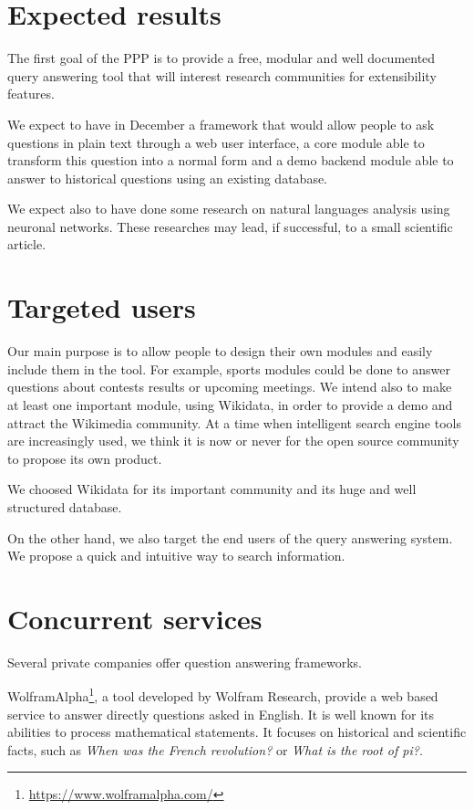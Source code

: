 \documentclass[a4paper,10pt]{article}
\begin{document}
\section{Expected results}
The first goal of the PPP is to provide a free, modular and well documented
query answering tool that will interest research communities for extensibility features. 

We expect to have in December a framework that would allow people to ask
questions in plain text through a web user interface, a core module able to transform
this question into a normal form and a demo backend module able to answer
to historical questions using an existing database.

We expect also to have done some research on natural languages analysis using
neuronal networks. These researches may lead, if successful, to
a small scientific article.

\section{Targeted users}

Our main purpose is to allow people to design their own modules and
easily include them in the tool. For example, sports modules could be done to 
answer questions about contests results or 
upcoming meetings.  We intend also to make at least one important module, using 
Wikidata, in order to provide a demo and attract the Wikimedia community. 
At a time when intelligent search engine tools are increasingly used, we think it 
is now or never for the open source community to propose its own product.

We choosed Wikidata for its important community and its huge and well structured database.

On the other hand, we also target the end users of the query answering system. We
propose a quick and intuitive way to search information.

\section{Concurrent services}

Several private companies offer question answering frameworks. 

WolframAlpha\footnote{\url{https://www.wolframalpha.com/}}, a tool developed by 
Wolfram Research, provide a web based service to answer directly questions asked
in English. It is well known for its abilities to process mathematical statements.
It focuses on historical and scientific facts, such as \emph{When was the French 
revolution?} or \emph{What is the root of pi?}.
\end{document}
